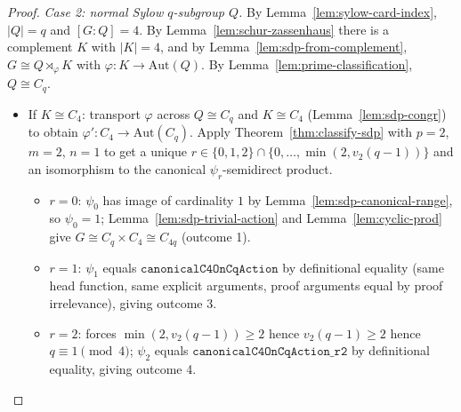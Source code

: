 \begin{proof}
    \emph{Case 2: normal Sylow $q$-subgroup $Q$.} By
    Lemma~\ref{lem:sylow-card-index}, $|Q| = q$ and $[G:Q] = 4$. By
    Lemma~\ref{lem:schur-zassenhaus} there is a complement $K$ with
    $|K| = 4$, and by Lemma~\ref{lem:sdp-from-complement},
    $G \cong Q \rtimes_\varphi K$ with $\varphi : K \to \mathrm{Aut}(Q)$. By
    Lemma~\ref{lem:prime-classification}, $Q \cong C_q$.

    \begin{itemize}
        \item If $K \cong C_4$: transport $\varphi$ across $Q \cong C_q$
            and $K \cong C_4$ (Lemma~\ref{lem:sdp-congr}) to obtain
            $\varphi' : C_4 \to \mathrm{Aut}(C_q)$. Apply
            Theorem~\ref{thm:classify-sdp} with $p = 2$, $m = 2$, $n = 1$ to
            get a unique
            $r \in \{0, 1, 2\} \cap \{0, \dots, \min(2, v_2(q-1))\}$ and an
            isomorphism to the canonical $\psi_r$-semidirect product.
            \begin{itemize}
                \item $r = 0$: $\psi_0$ has image of cardinality $1$ by
                    Lemma~\ref{lem:sdp-canonical-range}, so $\psi_0 = 1$;
                    Lemma~\ref{lem:sdp-trivial-action} and
                    Lemma~\ref{lem:cyclic-prod} give
                    $G \cong C_q \times C_4 \cong C_{4q}$ (outcome 1).
                \item $r = 1$: $\psi_1$ equals
                    $\mathtt{canonicalC4OnCqAction}$ by definitional equality
                    (same head function, same explicit arguments, proof
                    arguments equal by proof irrelevance), giving outcome 3.
                \item $r = 2$: forces $\min(2, v_2(q-1)) \geq 2$ hence
                    $v_2(q-1) \geq 2$ hence $q \equiv 1 \pmod 4$; $\psi_2$
                    equals $\mathtt{canonicalC4OnCqAction\_r2}$ by
                    definitional equality, giving outcome 4.
            \end{itemize}


\end{itemize}
\end{proof}
